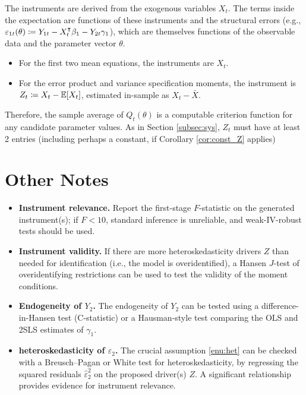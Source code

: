 The instruments are derived from the exogenous variables $X_{t}$.
The terms inside the expectation are functions of these instruments
and the structural errors (e.g., $\varepsilon_{1t}(\theta)\coloneqq Y_{1t}-X_{t}^{\intercal}\beta_{1}-Y_{2t}\gamma_{1}$),
which are themselves functions of the observable data and the parameter
vector $\theta$.
\begin{itemize}
\item For the first two mean equations, the instruments are $X_{t}$.
\item For the error product and variance specification moments, the instrument
is $Z_{t}\coloneqq X_{t}-\mathbb{E}[X_{t}]$, estimated in-sample as $X_{t}-\bar{X}$.
\end{itemize}
Therefore, the sample average of $Q_{t}(\theta)$ is a computable
criterion function for any candidate parameter values. As in Section \ref{subsec:sys}, $Z_t$
must have at least 2 entries (including perhaps a constant, if Corollary \ref{cor:const_Z} applies)

\section{Other Notes}
\begin{itemize}
\itemsep2pt
\item \textbf{Instrument relevance.} Report the first-stage $F$-statistic
on the generated instrument(s); if $F<10$, standard inference is
unreliable, and weak-IV-robust tests should be used.
\item \textbf{Instrument validity.} If there are more heteroskedasticity
drivers $Z$ than needed for identification (i.e., the model is overidentified),
a Hansen $J$-test of overidentifying restrictions can be used to
test the validity of the moment conditions.
\item \textbf{Endogeneity of $Y_{2}$.} The endogeneity of $Y_{2}$ can
be tested using a difference-in-Hansen test (C-statistic) or a Hausman-style
test comparing the OLS and 2SLS estimates of $\gamma_{1}$.
\item \textbf{heteroskedasticity of $\varepsilon_{2}$.} The crucial assumption
\ref{enu:het} can be checked with a Breusch--Pagan or White test
for heteroskedasticity, by regressing the squared residuals $\hat{\varepsilon}_{2}^{2}$
on the proposed driver(s) $Z$. A significant relationship provides
evidence for instrument relevance.
\end{itemize}

\printbibliography


